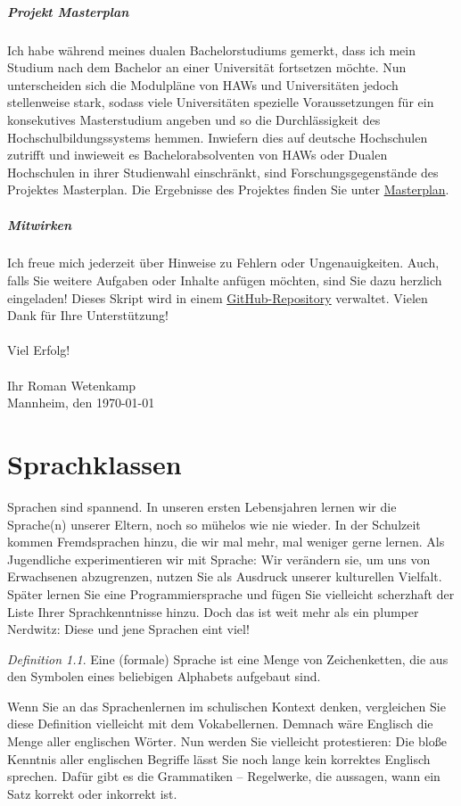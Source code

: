 \documentclass[11pt,a4paper]{scrreport}
\theoremstyle{remark}
\theoremstyle{custom}
\newtheorem{definition}{Definition}[section]
\begin{document}
\paragraph{Projekt {\glqq}Masterplan{\grqq}} Ich habe während meines dualen Bachelorstudiums gemerkt, dass ich mein Studium nach dem Bachelor an einer Universität fortsetzen möchte. Nun unterscheiden sich die Modulpläne von HAWs und Universitäten jedoch stellenweise stark, sodass viele Universitäten spezielle Voraussetzungen für ein konsekutives Masterstudium angeben und so die Durchlässigkeit des Hochschulbildungssystems hemmen. Inwiefern dies auf deutsche Hochschulen zutrifft und inwieweit es Bachelorabsolventen von HAWs oder Dualen Hochschulen in ihrer Studienwahl einschränkt, sind Forschungsgegenstände des Projektes {\glqq}Masterplan{\grqq}. Die Ergebnisse des Projektes finden Sie unter \href{http://masterplan.rwetenkamp.de}{Masterplan}.
\paragraph{Mitwirken} Ich freue mich jederzeit über Hinweise zu Fehlern oder Ungenauigkeiten. Auch, falls Sie weitere Aufgaben oder Inhalte anfügen möchten, sind Sie dazu herzlich eingeladen! Dieses Skript wird in einem \href{https://www.github.com/RWetenkamp/theoplus}{GitHub-Repository} verwaltet. Vielen Dank für Ihre Unterstützung!
\\\\
Viel Erfolg! \\\\
Ihr Roman Wetenkamp \\
Mannheim, den \today
\pagebreak
\chapter{Sprachklassen}
Sprachen sind spannend. In unseren ersten Lebensjahren lernen wir die Sprache(n) unserer Eltern, noch so mühelos wie nie wieder. In der Schulzeit kommen Fremdsprachen hinzu, die wir mal mehr, mal weniger gerne lernen. Als Jugendliche experimentieren wir mit Sprache: Wir verändern sie, um uns von Erwachsenen abzugrenzen, nutzen Sie als Ausdruck unserer kulturellen Vielfalt. Später lernen Sie eine Programmiersprache und fügen Sie vielleicht scherzhaft der Liste Ihrer Sprachkenntnisse hinzu. Doch das ist weit mehr als ein plumper Nerdwitz: Diese und jene Sprachen eint viel!
\begin{definition}
Eine (formale) Sprache ist eine Menge von Zeichenketten, die aus den Symbolen eines beliebigen Alphabets aufgebaut sind. 
\end{definition}
Wenn Sie an das Sprachenlernen im schulischen Kontext denken, vergleichen Sie diese Definition vielleicht mit dem Vokabellernen. Demnach wäre Englisch die Menge aller englischen Wörter. Nun werden Sie vielleicht protestieren: Die bloße Kenntnis aller englischen Begriffe lässt Sie noch lange kein korrektes Englisch sprechen. Dafür gibt es die Grammatiken -- Regelwerke, die aussagen, wann ein Satz korrekt oder inkorrekt ist.
\end{document}
